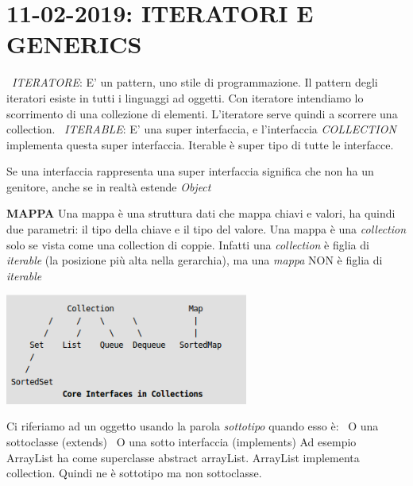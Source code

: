 

\newpage
\section{11-02-2019: ITERATORI E GENERICS}
\textbullet\  \textit{ITERATORE}: E' un pattern, uno stile di programmazione. Il pattern degli iteratori esiste in tutti i linguaggi ad oggetti. Con iteratore intendiamo lo scorrimento di una collezione di elementi. L'iteratore serve quindi a scorrere una collection.\newline
\textbullet\ \textit{ITERABLE}: E' una super interfaccia, e l'interfaccia \textit{COLLECTION} implementa questa super interfaccia. Iterable è super tipo di tutte le interfacce.

\noindent Se una interfaccia rappresenta una super interfaccia significa che non ha un genitore, anche se in realtà estende \textit{Object}


\noindent \textbf{MAPPA}\newline
Una mappa è una struttura dati che mappa chiavi e valori, ha quindi due parametri: il tipo della chiave e il tipo del valore. Una mappa è una \textit{collection} solo se vista come una collection di coppie. Infatti una \textit{collection} è figlia di \textit{iterable} (la posizione più alta nella gerarchia), ma una \textit{mappa} NON è figlia di \textit{iterable}
\begin{center}
\includegraphics[width=%
0.6\textwidth]{MapInterface}
\end{center} 
Ci riferiamo ad un oggetto usando la parola \textit{sottotipo} quando esso è:\newline
\textbullet\ O una sottoclasse (extends) \newline
\textbullet\ O una sotto interfaccia (implements) \newline
Ad esempio ArrayList ha come superclasse abstract arrayList. ArrayList implementa collection. Quindi ne è sottotipo ma non sottoclasse.

